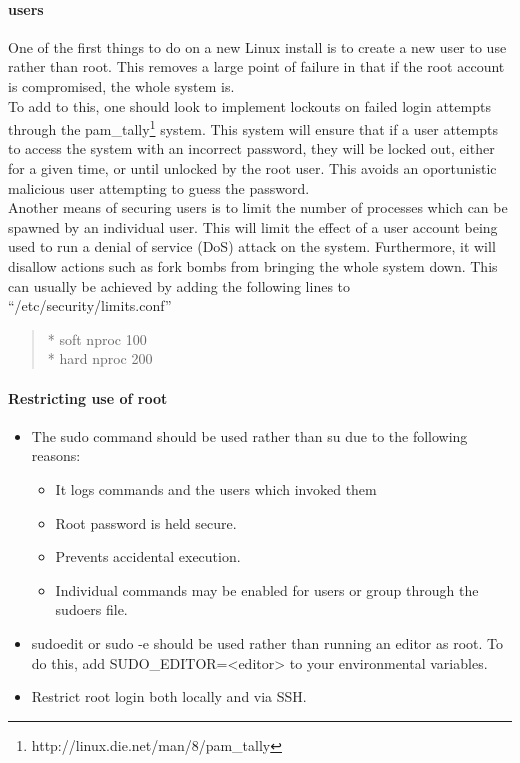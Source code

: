 \documentclass[a4paper,11pt]{article}
\begin{document}
			\paragraph{users}
				One of the first things to do on a new Linux install is to create a new user to use rather than root. 
				This removes a large point of failure in that if the root account is compromised, the whole system is.\\ 
				To add to this, one should look to implement lockouts on failed login attempts through the pam\_tally\footnote{http://linux.die.net/man/8/pam\_tally} system.
				This system will ensure that if a user attempts to access the system with an incorrect password, they will be locked out, either for a given time, or until unlocked by the root user. 
				This avoids an oportunistic malicious user attempting to guess the password. \\
				Another means of securing users is to limit the number of processes which can be spawned by an individual user. 
				This will limit the effect of a user account being used to run a denial of service (DoS) attack on the system. 
				Furthermore, it will disallow actions such as fork bombs from bringing the whole system down. 
				This can usually be achieved by adding the following lines to ``/etc/security/limits.conf''
				\begin{quote}
					\** soft nproc 100 \\
					\** hard nproc 200 \\
				\end{quote}

			\paragraph{Restricting use of root}
				\begin{itemize}
					\item The sudo command should be used rather than su due to the following reasons:
						\begin{itemize}
							\item It logs commands and the users which invoked them
							\item Root password is held secure. 
							\item Prevents accidental execution. 
							\item Individual commands may be enabled for users or group through the sudoers file. 
						\end{itemize}
					\item sudoedit or sudo -e should be used rather than running an editor as root. 
						To do this, add SUDO\_EDITOR=<editor> to your environmental variables.
					\item Restrict root login both locally and via SSH. 
				\end{itemize}
\end{document}
